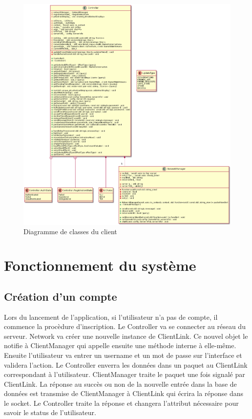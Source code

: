 \documentclass{article}
\begin{document}
\begin{figure}[H]
	\centering
	 \includegraphics[scale=0.3]{../../res/uml/class/ClientStructureClass.png}
	 \caption{Diagramme de classes du client}
	 \label{fig:WholeClientDiagram}
\end{figure}

\newpage

\section{Fonctionnement du système}

\subsection{Création d'un compte}

Lors du lancement de l'application, si l'utilisateur n'a pas de compte, il commence la procèdure d'inscription. Le Controller va se connecter au réseau du serveur. Network va créer une nouvelle instance de ClientLink. Ce nouvel objet le notifie à ClientManager qui appelle ensuite une méthode interne à elle-même. Ensuite l'utilisateur va entrer un username et un mot de passe sur l'interface et validera l'action. Le Controller enverra les données dans un paquet au ClientLink correspondant à l'utilisateur. ClientManager traite le paquet une fois signalé par ClientLink. La réponse au succès ou non de la nouvelle entrée dans la base de données est transmise de ClientManager à ClientLink qui écrira la réponse dans le socket. Le Controller traite la réponse et changera l'attribut nécessaire pour savoir le status de l'utilisateur.
\end{document}
